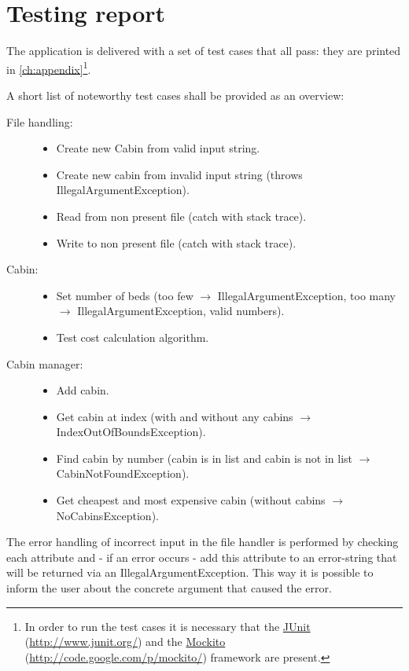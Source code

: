\chapter{Testing report}\label{ch:testing_report} %

The application is delivered with a set of test cases that all pass: they are printed in \autoref{ch:appendix}\footnote{In order to run the test cases it is necessary that the \href{http://www.junit.org/}{JUnit} (\url{http://www.junit.org/}) and the \href{http://code.google.com/p/mockito/}{Mockito} (\url{http://code.google.com/p/mockito/}) framework are present.}.

A short list of noteworthy test cases shall be provided as an overview:

\begin{description}
\item[File handling:] 

\begin{itemize}
\item Create new Cabin from valid input string.
\item Create new cabin from invalid input string (throws IllegalArgumentException).
\item Read from non present file (catch with stack trace).
\item Write to non present file (catch with stack trace).
\end{itemize}
\item[Cabin:]

\begin{itemize}
\item Set number of beds (too few $\rightarrow$ IllegalArgumentException, too many $\rightarrow$ IllegalArgumentException, valid numbers).
\item Test cost calculation algorithm.
\end{itemize}
\item[Cabin manager:]

\begin{itemize}
\item Add cabin.
\item Get cabin at index (with and without any cabins $\rightarrow$ IndexOutOfBoundsException).
\item Find cabin by number (cabin is in list and cabin is not in list $\rightarrow$ CabinNotFoundException).
\item Get cheapest and most expensive cabin (without cabins $\rightarrow$ NoCabinsException).
\end{itemize}
\end{description}

The error handling of incorrect input in the file handler is performed by checking each attribute and - if an error occurs - add this attribute to an error-string that will be returned via an IllegalArgumentException. This way it is possible to inform the user about the concrete argument that caused the error.